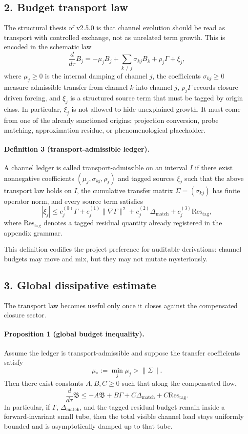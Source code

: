 \subsection*{2. Budget transport law}
The structural thesis of v2.5.0 is that channel evolution should be read as
transport with controlled exchange, not as unrelated term growth. This is encoded
in the schematic law
\[
\frac{d}{d\tau}B_j
= -\mu_j B_j + \sum_{k\neq j}\sigma_{kj}B_k + \rho_j\Gamma + \xi_j,
\]
where $\mu_j\ge0$ is the internal damping of channel $j$, the coefficients
$\sigma_{kj}\ge0$ measure admissible transfer from channel $k$ into channel $j$,
$\rho_j\Gamma$ records closure-driven forcing, and $\xi_j$ is a structured source
term that must be tagged by origin class. In particular, $\xi_j$ is not allowed to
hide unexplained growth. It must come from one of the already sanctioned origins:
projection conversion, probe matching, approximation residue, or phenomenological
placeholder.

\paragraph{Definition 3 (transport-admissible ledger).}
A channel ledger is called transport-admissible on an interval $I$ if there exist
nonnegative coefficients $(\mu_j,\sigma_{kj},\rho_j)$ and tagged sources $\xi_j$
such that the above transport law holds on $I$, the cumulative transfer matrix
$\Sigma=(\sigma_{kj})$ has finite operator norm, and every source term satisfies
\[
|\xi_j| \le c_j^{(0)}\Gamma + c_j^{(1)}\|\nabla\Gamma\|^2 + c_j^{(2)}\Delta_{\mathrm{match}}
+ c_j^{(3)}\mathrm{Res}_{\mathrm{tag}},
\]
where $\mathrm{Res}_{\mathrm{tag}}$ denotes a tagged residual quantity already
registered in the appendix grammar.

This definition codifies the project preference for auditable derivations: channel
budgets may move and mix, but they may not mutate mysteriously.

\subsection*{3. Global dissipative estimate}
The transport law becomes useful only once it closes against the compensated
closure sector.

\paragraph{Proposition 1 (global budget inequality).}
Assume the ledger is transport-admissible and suppose the transfer coefficients
satisfy
\[
\mu_* := \min_j \mu_j > \|\Sigma\|.
\]
Then there exist constants $A,B,C\ge0$ such that along the compensated flow,
\[
\frac{d}{d\tau}\mathfrak B
\le -A\mathfrak B + B\Gamma + C\Delta_{\mathrm{match}} + C\mathrm{Res}_{\mathrm{tag}}.
\]
In particular, if $\Gamma$, $\Delta_{\mathrm{match}}$, and the tagged residual budget
remain inside a forward-invariant small tube, then the total visible channel load
stays uniformly bounded and is asymptotically damped up to that tube.


